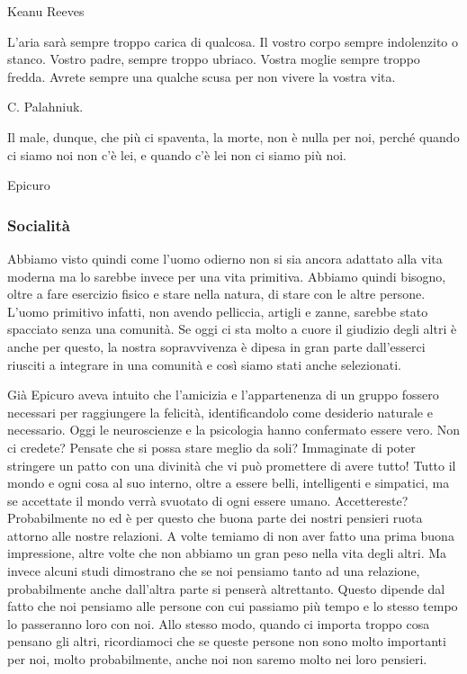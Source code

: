 \documentclass[12pt]{book} %
\begin{document}
\begin{mdframed}[linewidth=1pt]
Keanu Reeves


\bigskip

L'aria sarà sempre troppo carica di qualcosa. Il vostro corpo sempre indolenzito o stanco. Vostro
padre, sempre troppo ubriaco. Vostra moglie sempre troppo fredda. Avrete sempre una qualche scusa per non vivere la
vostra vita.

C. Palahniuk.


\bigskip

Il male, dunque, che più ci spaventa, la morte, non è nulla per noi, perché quando ci siamo noi non c'è lei, e quando
c'è lei non ci siamo più noi. 

Epicuro
\end{mdframed}

\bigskip

\subsubsection{Socialità}
Abbiamo visto quindi come l'uomo odierno non si sia ancora adattato alla vita moderna ma lo sarebbe
invece per una vita primitiva. Abbiamo quindi bisogno, oltre a fare esercizio fisico e stare nella natura, di stare con
le altre persone. L'uomo primitivo infatti, non avendo pelliccia, artigli e zanne, sarebbe stato
spacciato senza una comunità. Se oggi ci sta molto a cuore il giudizio degli altri è anche per questo, la nostra
sopravvivenza è dipesa in gran parte dall'esserci riusciti a integrare in una comunità e così
siamo stati anche selezionati. 

Già Epicuro aveva intuito che l'amicizia e l'appartenenza di un gruppo fossero
necessari per raggiungere la felicità, identificandolo come desiderio naturale e necessario. Oggi le neuroscienze e la
psicologia hanno confermato essere vero. Non ci credete? Pensate che si possa stare meglio da soli? Immaginate di poter
stringere un patto con una divinità che vi può promettere di avere tutto! Tutto il mondo e ogni cosa al suo interno,
oltre a essere belli, intelligenti e simpatici, ma se accettate il mondo verrà svuotato di ogni essere umano.
Accettereste? Probabilmente no ed è per questo che buona parte dei nostri pensieri ruota attorno alle nostre relazioni.
A volte temiamo di non aver fatto una prima buona impressione, altre volte che non abbiamo un gran peso nella vita
degli altri. Ma invece alcuni studi dimostrano che se noi pensiamo tanto ad una relazione, probabilmente anche
dall'altra parte si penserà altrettanto. Questo dipende dal fatto che noi pensiamo alle persone
con cui passiamo più tempo e lo stesso tempo lo passeranno loro con noi. Allo stesso modo, quando ci importa troppo
cosa pensano gli altri, ricordiamoci che se queste persone non sono molto importanti per noi, molto probabilmente,
anche noi non saremo molto nei loro pensieri.
\end{document}
